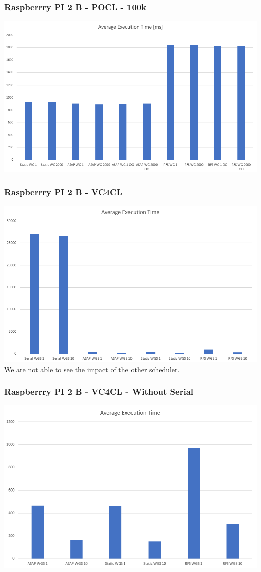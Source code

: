 \documentclass{beamer}
\begin{document}
\begin{frame}
	\frametitle{Raspberrry PI 2 B - POCL - 100k}
	\includegraphics[width=.8\textwidth]{res/ResultsPOCL-100k_WithoutSerial.PNG}
\end{frame}
\begin{frame}
	\frametitle{Raspberrry PI 2 B - VC4CL}
	\includegraphics[width=.8\textwidth]{res/ResultsVC4CL.PNG}\\
	We are not able to see the impact of the other scheduler.
\end{frame}
\begin{frame}
	\frametitle{Raspberrry PI 2 B - VC4CL - Without Serial}
	\includegraphics[width=.8\textwidth]{res/ResultsVC4CL_WithoutSerial.PNG}
\end{frame}
\end{document}
